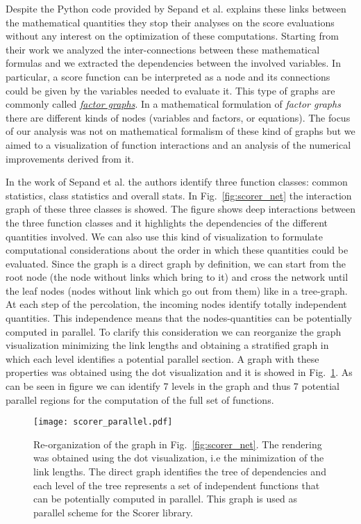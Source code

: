 \documentclass{standalone}
\begin{document}
Despite the \textsf{Python} code provided by Sepand et al. explains these links between the mathematical quantities they stop their analyses on the score evaluations without any interest on the optimization of these computations.
Starting from their work we analyzed the inter-connections between these mathematical formulas and we extracted the dependencies between the involved variables.
In particular, a score function can be interpreted as a node and its connections could be given by the variables needed to evaluate it.
This type of graphs are commonly called \href{https://en.wikipedia.org/wiki/Factor_graph}{\emph{factor graphs}}.
In a mathematical formulation of \emph{factor graphs} there are different kinds of nodes (variables and factors, or equations).
The focus of our analysis was not on mathematical formalism of these kind of graphs but we aimed to a visualization of function interactions and an analysis of the numerical improvements derived from it.

In the work of Sepand et al. the authors identify three function classes: common statistics, class statistics and overall stats.
In Fig.~\ref{fig:scorer_net} the interaction graph of these three classes is showed.
The figure shows deep interactions between the three function classes and it highlights the dependencies of the different quantities involved.
We can also use this kind of visualization to formulate computational considerations about the order in which these quantities could be evaluated.
Since the graph is a direct graph by definition, we can start from the root node (the node without links which bring to it) and cross the network until the leaf nodes (nodes without link which go out from them) like in a tree-graph.
At each step of the percolation, the incoming nodes identify totally independent quantities.
This independence means that the nodes-quantities can be potentially computed in parallel.
To clarify this consideration we can reorganize the graph visualization minimizing the link lengths and obtaining a stratified graph in which each level identifies a potential parallel section.
A graph with these properties was obtained using the \textsf{dot} visualization and it is showed in Fig.~\ref{fig:scorer_parallel}.
As can be seen in figure we can identify 7 levels in the graph and thus 7 potential parallel regions for the computation of the full set of functions.

\begin{center}
\begin{figure}[htbp]
\hspace{-2cm}
\texttt{[image: scorer\_parallel.pdf]}
\caption{Re-organization of the graph in Fig.~\ref{fig:scorer_net}.
The rendering was obtained using the \textsf{dot} visualization, i.e the minimization of the link lengths.
The direct graph identifies the tree of dependencies and each level of the tree represents a set of independent functions that can be potentially computed in parallel.
This graph is used as parallel scheme for the \textsf{Scorer} library.
}
\label{fig:scorer_parallel}
\end{figure}
\end{center}
\end{document}
